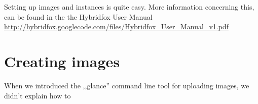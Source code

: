 \documentclass[a4paper,ngerman,bibtotocliststotoc]{scrartcl}
\begin{document}
Setting up images and instances is quite easy. More information
concerning this, can be found in the the Hybridfox User Manual \cite{hybridfoxMan}
\url{http://hybridfox.googlecode.com/files/Hybridfox_User_Manual_v1.pdf}

\section{Creating images}
\label{sec:creating-images}
When we introduced the ,,glance'' command line tool for uploading
images, we didn't explain how to 
\end{document}
